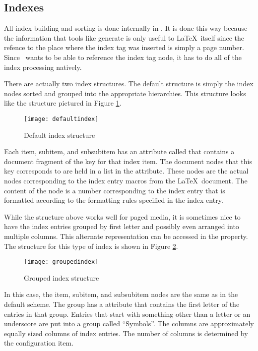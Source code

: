 \subsection{Indexes}

All index building and sorting is done internally in \plasTeX.  It is 
done this way because the information that tools like 
generate is only useful to \LaTeX\ itself since the refence to the 
place where the index tag was inserted is simply a page number.  Since
\plasTeX\ wants to be able to reference the index tag node, it has 
to do all of the index processing natively.

There are actually two index structures.  The default structure is simply 
the index nodes sorted and grouped into the appropriate hierarchies.
This structure looks like the structure pictured in Figure 
\ref{fig:defaultindex}.
\begin{figure}[ht]
\begin{center}
\texttt{[image: defaultindex]}
\end{center}
\caption{Default index structure\label{fig:defaultindex}}
\end{figure}

Each item, subitem, and subsubitem has an attribute called 
that contains a document fragment of the key for that index item.
The document nodes that this key corresponds to are held in a list
in the  attribute.  These nodes are the actual 
nodes corresponding to the index entry macros from the \LaTeX\ document.
The content of the node is a number corresponding to the index entry
that is formatted according to the formatting rules specified in the
index entry.

While the structure above works well for paged media, it is sometimes 
nice to have the index entries grouped by first letter and possibly
even arranged into multiple columns.  This alternate representation
can be accessed in the  property.  The structure 
for this type of index is shown in Figure \ref{fig:groupedindex}.
\begin{figure}[ht]
\begin{center}
\texttt{[image: groupedindex]}
\end{center}
\caption{Grouped index structure\label{fig:groupedindex}}
\end{figure}

In this case, the item, subitem, and subsubitem nodes are the same as in
the default scheme.  The group has a  attribute that contains
the first letter of the entries in that group.  Entries that start with
something other than a letter or an underscore are put into a group
called ``Symbols''.  The columns are approximately equally sized columns
of index entries.  The number of columns is determined by the 
 configuration item.
